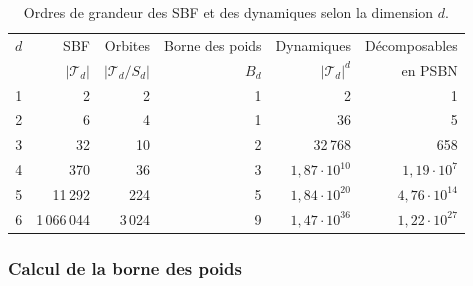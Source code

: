 \documentclass[12pt, a4paper]{article}
\begin{document}
\begin{table}[H]
\centering
\caption{Ordres de grandeur des SBF et des dynamiques selon la dimension $d$.}
\label{tab:echelles}
\begin{tabular}{rrrrrr}
\toprule
$d$ & SBF & Orbites & Borne des poids & Dynamiques & Décomposables \\
 & $|\mathcal{T}_d|$ & $|\mathcal{T}_d/S_d|$ & $B_d$ & $|\mathcal{T}_d|^d$ & en PSBN \\
\midrule
1 & 2 & 2 & 1 & 2 & 1 \\
2 & 6 & 4 & 1 & 36 & 5 \\
3 & 32 & 10 & 2 & 32\,768 & 658 \\
4 & 370 & 36 & 3 & $1{,}87 \cdot 10^{10}$ & $1{,}19 \cdot 10^{7}$ \\
5 & 11\,292 & 224 & 5 & $1{,}84 \cdot 10^{20}$ & $4{,}76 \cdot 10^{14}$ \\
6 & 1\,066\,044 & 3\,024 & 9 & $1{,}47 \cdot 10^{36}$ & $1{,}22 \cdot 10^{27}$ \\
\bottomrule
\end{tabular}
\end{table}

\subsubsection{Calcul de la borne des poids}
\label{sec:calcul-borne}
\end{document}
